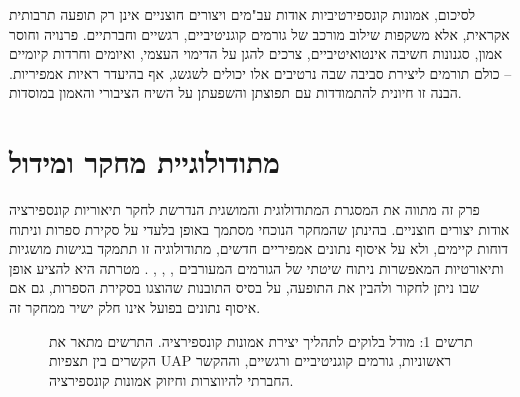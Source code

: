 \documentclass[12pt,a4paper]{article}
\begin{document}
לסיכום, אמונות קונספירטיביות אודות עב"מים ויצורים חוצניים אינן רק תופעה תרבותית אקראית, אלא משקפות שילוב מורכב של גורמים קוגניטיביים, רגשיים וחברתיים. פרנויה וחוסר אמון, סגנונות חשיבה אינטואיטיביים, צרכים להגן על הדימוי העצמי, ואיומים וחרדות קיומיים – כולם תורמים ליצירת סביבה שבה נרטיבים אלו יכולים לשגשג, אף בהיעדר ראיות אמפיריות. הבנה זו חיונית להתמודדות עם תפוצתן והשפעתן על השיח הציבורי והאמון במוסדות.

\section{מתודולוגיית מחקר ומידול}

פרק זה מתווה את המסגרת המתודולוגית והמושגית הנדרשת לחקר תיאוריות קונספירציה אודות יצורים חוצניים. בהינתן שהמחקר הנוכחי מסתמך באופן בלעדי על סקירת ספרות וניתוח דוחות קיימים, ולא על איסוף נתונים אמפיריים חדשים, מתודולוגיה זו תתמקד בגישות מושגיות ותיאורטיות המאפשרות ניתוח שיטתי של הגורמים המעורבים \cite{aaro2024misidentification}, \cite{aaro2024noevidence}, \cite{wojcik2021cosmologies}, \cite{bowes2023conspiracy, biddlestone2025conspiracy, ellwood1999ufo}. מטרתה היא להציע אופן שבו ניתן לחקור ולהבין את התופעה, על בסיס התובנות שהוצגו בסקירת הספרות, גם אם איסוף נתונים בפועל אינו חלק ישיר ממחקר זה.

\begin{figure}[h!]
    \centering
    \caption{תרשים 1: מודל בלוקים לתהליך יצירת אמונות קונספירציה. התרשים מתאר את הקשרים בין תצפיות UAP ראשוניות, גורמים קוגניטיביים ורגשיים, וההקשר החברתי להיווצרות וחיזוק אמונות קונספירציה.}
    \label{fig:conspiracy_model}
\end{figure}
\end{document}
